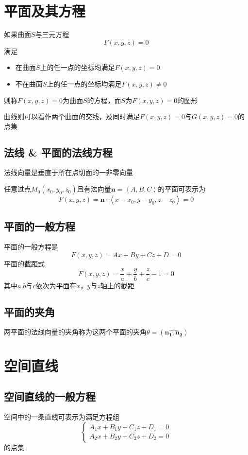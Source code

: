 \documentclass[UTF8]{ctexart}
\newcommand{\ve}[1]{{\bm{#1}}}
\newcommand{\veN}[3]{{\left\langle#1,#2,#3\right\rangle}}
\newcommand{\ang}[2]{{(\widehat{\ve{#1},\ve{#2}})}}
\begin{document}
\bigskip
\bigskip

\section*{平面及其方程}

如果曲面$S$与三元方程
\[F(x,y,z)=0\]
满足
\begin{itemize}
  \item 在曲面$S$上的任一点的坐标均满足$F(x,y,z)=0$
  \item 不在曲面$S$上的任一点的坐标均满足$F(x,y,z)\ne0$
\end{itemize}
则称$F(x,y,z)=0$为曲面$S$的方程，而$S$为$F(x,y,z)=0$的图形

曲线则可以看作两个曲面的交线，及同时满足$F(x,y,z)=0$与$G(x,y,z)=0$的点集

\subsection*{法线 \& 平面的法线方程}
法线向量是垂直于所在点切面的一非零向量

任意过点$M_0(x_0,y_0,z_0)$且有法向量$\ve{n}=\veN{A}{B}{C}$的平面可表示为
\[F(x,y,z)=\ve{n}\cdot\veN{x-x_0}{y-y_0}{z-z_0}=0\]

\subsection*{平面的一般方程}
平面的一般方程是
\[F(x,y,z)=Ax+By+Cz+D=0\]
平面的截距式
\[F(x,y,z)=\frac{x}{a}+\frac{y}{b}+\frac{z}{c}-1=0\]
其中$a$,$b$与$c$依次为平面在$x$，$y$与$z$轴上的截距

\subsection*{平面的夹角}
两平面的法线向量的夹角称为这两个平面的夹角$\theta=\ang{n_1}{n_2}$
\bigskip
\bigskip
\section*{空间直线}

\bigskip

\subsection{空间直线的一般方程}
空间中的一条直线可表示为满足方程组
\[\begin{cases}
A_1x+B_1y+C_1z+D_1=0\\
A_2x+B_2y+C_2z+D_2=0
\end{cases}\]
的点集
\end{document}
